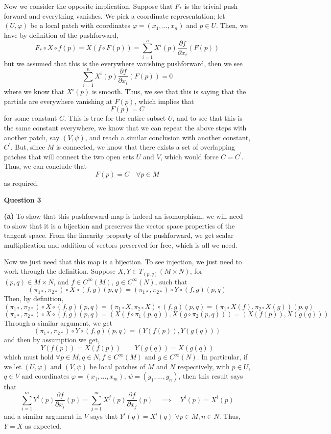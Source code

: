 \documentclass[10pt]{article}
\begin{document}
Now we consider the opposite implication. Suppose that $F_{*}$ is the trivial push forward and everything vanishes. We pick a coordinate representation; let $(U,\varphi)$ be a local patch with coordinates $\varphi = (x_{1},\dots,x_{n})$ and $p\in U$. Then, we have by definition of the pushforward,
\[ F_{*}\circ X\circ f(p) = X(f\circ F(p)) = \sum_{i=1}^{n}X^{i}(p)\frac{\partial f}{\partial x_{i}}(F(p)) \]
but we assumed that this is the everywhere vanishing pushforward, then we see
\[ \sum_{i=1}^{n}X^{i}(p)\frac{\partial f}{\partial x_{i}}(F(p)) = 0 \]
where we know that $X^{i}(p)$ is smooth. Thus, we see that this is saying that the partials are everywhere vanishing at $F(p)$, which implies that
\[ F(p) = C \]
for some constant $C$. This is true for the entire subset $U$, and to see that this is the same constant everywhere, we know that we can repeat the above steps with another patch, say $(V,\psi)$, and reach a similar conclusion with another constant, $C^{\prime}$. But, since $M$ is connected, we know that there exists a set of overlapping patches that will connect the two open sets $U$ and $V$, which would force $C = C^{\prime}$. Thus, we can conclude that
\[ F(p) = C \hspace{1em} \forall p\in M \]
as required.

\newpage
\textbf{Question 3}

\textbf{(a)} To show that this pushforward map is indeed an isomorphism, we will need to show that it is a bijection and preserves the vector space properties of the tangent space. From the linearity property of the pushforward, we get scalar multiplication and addition of vectors preserved for free, which is all we need.

Now we just need that this map is a bijection. To see injection, we just need to work through the definition. Suppose $X,Y\in T_{(p,q)}(M\times N)$, for $(p,q)\in M\times N$, and $f\in C^{\infty}(M)$, $g\in C^{\infty}(N)$, such that
\[ (\pi_{1*},\pi_{2*})\circ X \circ (f,g) (p,q) = (\pi_{1*},\pi_{2*})\circ Y \circ (f,g) (p,q) \]
Then, by definition,
\[ (\pi_{1*},\pi_{2*})\circ X \circ (f,g) (p,q) = (\pi_{1*}X, \pi_{2*}X)\circ (f,g)(p,q) = (\pi_{1*}X(f), \pi_{2*}X(g))(p,q) \]
\[ (\pi_{1*},\pi_{2*})\circ X \circ (f,g) (p,q) = (X(f\circ \pi_{1}(p,q)), X(g\circ \pi_{2}(p,q))) = (X(f(p)),X(g(q)))\]
Through a similar argument, we get
\[  (\pi_{1*},\pi_{2*})\circ Y \circ (f,g) (p,q) = (Y(f(p)),Y(g(q))) \]
and then by assumption we get,
\[ Y(f(p)) = X(f(p)) \hspace{2em} Y(g(q)) = X(g(q)) \]
which must hold $\forall p\in M, q\in N, f\in C^{\infty}(M)$ and $g\in C^{\infty}(N)$. In particular, if we let $(U,\varphi)$ and $(V,\psi)$ be local patches of $M$ and $N$ respectively, with $p\in U$, $q\in V$ and coordinates $\varphi = (x_{1},\dots,x_{m})$, $\psi = (y_{1},\dots,y_{n})$, then this result says that
\[ \sum_{i=1}^{m}Y^{i}(p) \frac{\partial f}{\partial x_{i}}(p) = \sum_{j=1}^{m}X^{j}(p) \frac{\partial f}{\partial x_{j}}(p) \hspace{1em} \implies \hspace{1em} Y^{i}(p) = X^{i}(p)\]
and a similar argument in $V$ says that $Y^{i}(q) = X^{i}(q)$ $\forall p\in M,n\in N$. Thus, $Y=X$ as expected.
\end{document}
